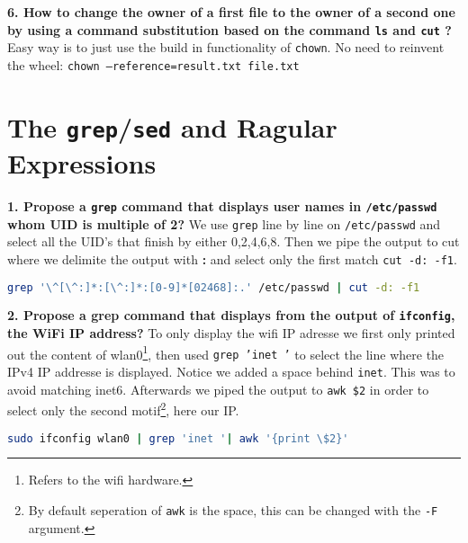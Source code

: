 \documentclass[a4paper,oneside,onecolumn]{article}
\newcommand{\code}[1]{\colorbox{codegray}{\texttt{#1}}}
\begin{document}
\noindent
\textbf{6. How to change the owner of a first file to the owner of a second one by using a command substitution based on the command \code{ls} and \code{cut} ?}
\newline
\newline
Easy way is to just use the build in functionality of \code{chown}. No need to reinvent the wheel:
\newline
\code{chown --reference=result.txt file.txt}

\section*{The \code{grep}/\code{sed} and Ragular Expressions}

\noindent 
\textbf{1. Propose a \code{grep} command that displays user names in \texttt{/etc/passwd}
whom UID is multiple of 2?}
\newline
\newline
We use \code{grep} line by line on \texttt{/etc/passwd} and select all the UID's that finish by either 0,2,4,6,8. Then we pipe the output to cut where we delimite the output with \textbf{:} and select only the first match \code{cut -d: -f1}.
\newline
\newline
\begin{lstlisting}[language=bash]
grep '\^[\^:]*:[\^:]*:[0-9]*[02468]:.' /etc/passwd | cut -d: -f1
\end{lstlisting}

\noindent
\textbf{2. Propose a grep command that displays from the output of \code{ifconfig}, the WiFi IP address?}
\newline
\newline
To only display the wifi IP adresse we first only printed out the content of wlan0\footnote{Refers to the wifi hardware.}, then used \code{grep 'inet '} to select the line where the IPv4 IP addresse is displayed. Notice we added a space behind \texttt{inet}. This was to avoid matching inet6. Afterwards we piped the output to \code{awk \$2} in order to select only the second motif\footnote{By default seperation of \code{awk} is the space, this can be changed with the \code{-F} argument.}, here our IP.
\newline
\newline
\begin{lstlisting}[language=bash]
sudo ifconfig wlan0 | grep 'inet '| awk '{print \$2}'
\end{lstlisting}
\noindent
\end{document}
